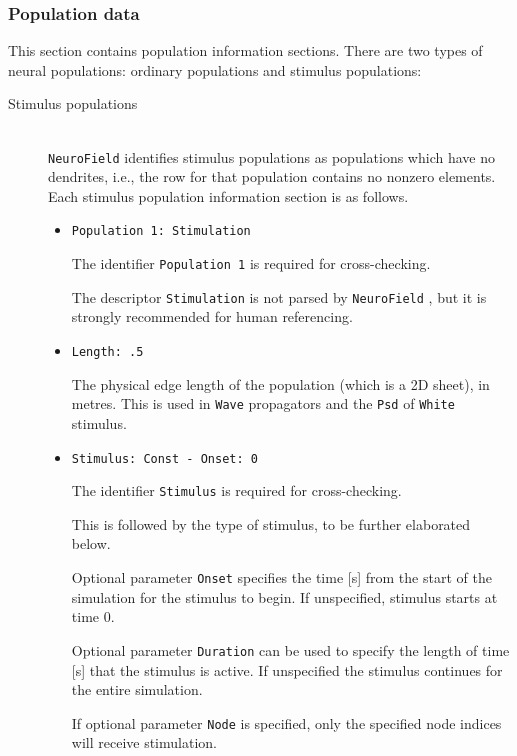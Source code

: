 \documentclass[12pt,a4paper]{article}
\newcommand{\type}[1]{{\small\small\tt #1} }
\newcommand{\NF}[0]{\type{NeuroField}}
\begin{document}
\subsubsection{Population data}
\label{sec:pop_conf}
This section contains population information sections. There are two types of neural populations: ordinary populations and stimulus populations:
\begin{description}

\item[Stimulus populations]\ \\

\NF identifies stimulus populations as populations which have no dendrites, i.e., the row for that population contains no nonzero elements.  Each stimulus population information section is as follows.
\begin{itemize}
    \item \begin{lstlisting}
Population 1: Stimulation
    \end{lstlisting}
    The identifier \type{Population 1} is required for cross-checking.

    The descriptor \type{Stimulation} is not parsed by \NF, but it is strongly recommended for human referencing.
    \item
    \begin{lstlisting}
Length: .5
    \end{lstlisting}
    The physical edge length of the population (which is a 2D sheet), in metres. This is used in \type{Wave} propagators and the \type{Psd} of \type{White} stimulus.
    \item
    \begin{lstlisting}
Stimulus: Const - Onset: 0
    \end{lstlisting}
    The identifier \type{Stimulus} is required for cross-checking.

    This is followed by the type of stimulus, to be further elaborated below.

    Optional parameter \type{Onset} specifies the time [s] from the start of the simulation for the stimulus to begin. If unspecified, stimulus starts at time 0.

    Optional parameter \type{Duration} can be used to specify the length of time [s] that the stimulus is active. If unspecified the stimulus continues for the entire simulation.

    If optional parameter \type{Node} is specified, only the specified node indices will receive stimulation.


\end{itemize}
\end{description}
\end{document}
